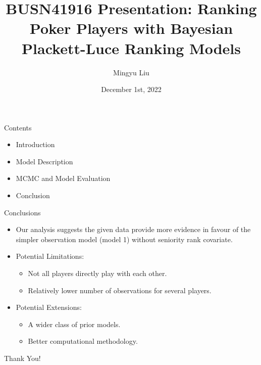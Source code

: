 \documentclass{beamer}
\title{BUSN41916 Presentation: Ranking Poker Players with Bayesian Plackett-Luce Ranking Models}
\author{Mingyu Liu}
\date{December 1st, 2022}
\begin{document}
\maketitle
\begin{frame}{Contents}
    \begin{itemize}
        \item Introduction
        \item Model Description
        \item MCMC and Model Evaluation
        \item Conclusion
    \end{itemize}
\end{frame}





\begin{frame}{Conclusions}
\begin{itemize}
\item Our analysis suggests the given data provide more evidence in favour of the simpler observation model (model 1) without seniority rank covariate.

\item Potential Limitations:
\begin{itemize}
    \item Not all players directly play with each other.
    \item Relatively lower number of observations for several players.
\end{itemize}

\item Potential Extensions:
\begin{itemize}
    \item A wider class of prior models.
    \item Better computational methodology.
\end{itemize}

\end{itemize}
\end{frame}

\begin{frame}
\begin{center}
\Huge Thank You!
\end{center}
\end{frame}
\end{document}
